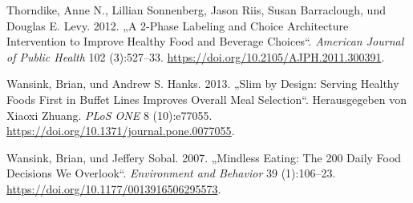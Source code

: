 \documentclass[12pt,ngerman,]{article}
\begin{document}
\leavevmode\hypertarget{ref-thorndike_2-phase_2012}{}%
Thorndike, Anne N., Lillian Sonnenberg, Jason Riis, Susan Barraclough,
und Douglas E. Levy. 2012. „A 2-Phase Labeling and Choice Architecture
Intervention to Improve Healthy Food and Beverage Choices``.
\emph{American Journal of Public Health} 102 (3):527--33.
\url{https://doi.org/10.2105/AJPH.2011.300391}.

\leavevmode\hypertarget{ref-wansink_slim_2013}{}%
Wansink, Brian, und Andrew S. Hanks. 2013. „Slim by Design: Serving
Healthy Foods First in Buffet Lines Improves Overall Meal Selection``.
Herausgegeben von Xiaoxi Zhuang. \emph{PLoS ONE} 8 (10):e77055.
\url{https://doi.org/10.1371/journal.pone.0077055}.

\leavevmode\hypertarget{ref-wansink_mindless_2007}{}%
Wansink, Brian, und Jeffery Sobal. 2007. „Mindless Eating: The 200 Daily
Food Decisions We Overlook``. \emph{Environment and Behavior} 39
(1):106--23. \url{https://doi.org/10.1177/0013916506295573}.
\end{document}
